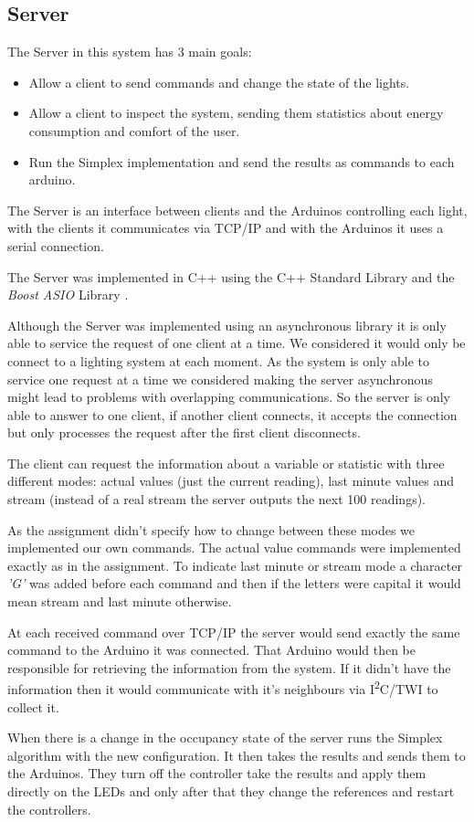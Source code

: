 \subsection{Server}
\label{sec:Server}

The Server in this system has 3 main goals:
\begin{itemize}
    \item Allow a client to send commands and change the state of the lights.
    \item Allow a client to inspect the system, sending them statistics about energy consumption and comfort of the user.
    \item Run the Simplex implementation and send the results as commands to each arduino.
\end{itemize}

The Server is an interface between clients and the Arduinos controlling each light, with the clients it communicates via TCP/IP and with the Arduinos it uses a serial connection.

The Server was implemented in C++ using the C++ Standard Library and the \emph{Boost ASIO} Library \cite{BoostSite}.

Although the Server was implemented using an asynchronous library it is only able to service the request of one client at a time.
We considered it would only be connect to a lighting system at each moment.
As the system is only able to service one request at a time we considered making the server asynchronous might lead to problems with overlapping communications.
So the server is only able to answer to one client, if another client connects, it accepts the connection but only processes the request after the first client disconnects.

The client can request the information about a variable or statistic with three different modes: actual values (just the current reading), last minute values and stream (instead of a real stream the server outputs the next 100 readings).

As the assignment didn't specify how to change between these modes we implemented our own commands. The actual value commands were implemented exactly as in the assignment.
To indicate last minute or stream mode a character \emph{'G'} was added before each command and then if the letters were capital it would mean stream and last minute otherwise.

At each received command over TCP/IP the server would send exactly the same command to the Arduino it was connected. That Arduino would then be responsible for retrieving the information from the system. If it didn't have the information then it would communicate with it's neighbours via  I\textsuperscript{2}C/TWI to collect it.

When there is a change in the occupancy state of the server runs the Simplex algorithm with the new configuration. It then takes the results and sends them to the Arduinos. They turn off the controller take the results and apply them directly on the LEDs and only after that they change the references and restart the controllers.
